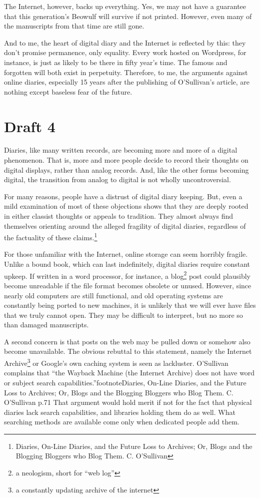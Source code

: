 \documentclass[12pt]{article}[titlepage]
\newcommand{\say}[1]{``#1''}
\newcommand{\1}{\={a}}
\newcommand{\2}{\={e}}
\newcommand{\3}{\={\i}}
\newcommand{\4}{\=o}
\newcommand{\5}{\=u}
\newcommand{\6}{\={A}}
\renewcommand{\,}{\textsuperscript{,}}
\begin{document}
The Internet, however, backs up everything.
Yes, we may not have a guarantee that this generation’s Beowulf will survive if not printed.
However, even many of the manuscripts from that time are still gone.

And to me, the heart of digital diary and the Internet is reflected by this: they don’t promise permanence, only equality.
Every work hosted on Wordpress, for instance, is just as likely to be there in fifty year’s time.
The famous and forgotten will both exist in perpetuity.
Therefore, to me, the arguments against online diaries, especially 15 years after the publishing of O’Sullivan’s article, are nothing except baseless fear of the future.

\section{Draft 4}

Diaries, like many written records, are becoming more and more of a digital phenomenon.
That is, more and more people decide to record their thoughts on digital displays, rather than analog records.
And, like the other forms becoming digital, the transition from analog to digital is not wholly uncontroversial.

For many reasons, people have a distrust of digital diary keeping.
But, even a mild examination of most of these objections shows that they are deeply rooted in either classist thoughts or appeals to tradition.
They almost always find themselves orienting around the alleged fragility of digital diaries, regardless of the factuality of these claims.\footnote{Diaries, On-Line Diaries, and the Future Loss to Archives; Or, Blogs and the Blogging Bloggers who Blog Them. C. O’Sullivan}

For those unfamiliar with the Internet, online storage can seem horribly fragile.
Unlike a bound book, which can last indefinitely, digital diaries require constant upkeep.
If written in a word processor, for instance, a blog\footnote{a neologism, short for \say{web log}} post could plausibly become unreadable if the file format becomes obsolete or unused.
However, since nearly old computers are still functional, and old operating systems are constantly being ported to new machines, it is unlikely that we will ever have files that we truly cannot open.
They may be difficult to interpret, but no more so than damaged manuscripts.

A second concern is that posts on the web may be pulled down or somehow also become unavailable.
The obvious rebuttal to this statement, namely the Internet Archive\footnote{a constantly updating archive of the internet} or Google’s own caching system is seen as lackluster.
O’Sullivan complains that \say{the Wayback Machine (the Internet Archive) does not have word or subject search capabilities.}footnote{Diaries, On-Line Diaries, and the Future Loss to Archives; Or, Blogs and the Blogging Bloggers who Blog Them. C. O’Sullivan p.71}
That argument would hold merit if not for the fact that physical diaries lack search capabilities, and libraries holding them do as well.
What searching methods are available come only when dedicated people add them.
\end{document}
